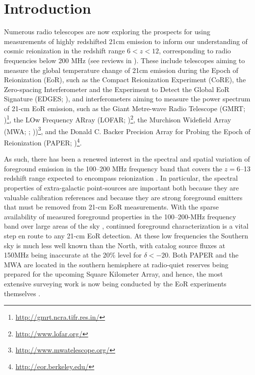 \documentclass[preprint]{aastex}
\begin{document}


\section{Introduction}

Numerous radio telescopes are now exploring the prospects for using
measurements of highly redshifted 21cm emission to inform our understanding of
cosmic reionization in the redshift range $6< z<12$, corresponding to radio
frequencies below 200 MHz (see reviews in
\citealt{Furlanetto:2006p2267,Morales:2010p8093,Pritchard:2012p9555}).  These
include telescopes aiming to measure the global temperature change of 21cm
emission during the Epoch of Reionization (EoR), such as the Compact
Reionization Experiment (CoRE), the Zero-spacing Interferometer \citep{Raghunathan:2011}  and the Experiment to Detect the Global EoR
Signature (EDGES; \citealt{Bowman:2010p8546}), and interferometers aiming to
measure the power spectrum of 21-cm EoR emission, such as the Giant Metre-wave
Radio Telescope (GMRT;
\citealt{Paciga:2011p9470,Paciga:2013p9627})\footnote{\url{http://gmrt.ncra.tifr.res.in/}},
the LOw Frequency ARray (LOFAR;
\citealt{Yatawatta:2013p9699})\footnote{\url{http://www.lofar.org/}}, the
Murchison Widefield Array (MWA;  \citealt{Bowman:2012p9138};
\citealt{Tingay:2013p9022}))\footnote{\url{http://www.mwatelescope.org/}}, and
the Donald C. Backer Precision Array for Probing the Epoch of Reionization
(PAPER; \citealt{Parsons:2010p6757,Pober:2013p9567})\footnote{\url{http://eor.berkeley.edu/}}.

As such, there has been a renewed interest in the spectral and spatial variation of
foreground emission in the 100--200 MHz frequency band that covers
the $z=6$--13 redshift range expected to encompass reionization
\citep{Furlanetto:2006p2267}.
In particular, the spectral properties of extra-galactic point-sources are important
both because they are valuable calibration references
and because they are strong foreground emitters that must be removed from 21-cm EoR measurements.
With the sparse availability of measured foreground properties in the
100--200-MHz frequency band over large areas of the sky \citep{deOliveiraCosta:2008p2242}, continued
foreground characterization is a
vital step en route to any 21-cm EoR detection.
At these low
frequencies the Southern sky is much less well known than the North, 
with catalog source fluxes at 150MHz being inaccurate at the 20\% level
for $\delta<-20$\arcdeg \citep{Slee:1995p7541,Vollmer:2005p6425}.
Both PAPER and the MWA are located in the southern hemisphere at radio-quiet
reserves being prepared for the upcoming Square Kilometer Array, and hence,
the
most extensive surveying work is now being conducted by the EoR experiments
themselves \citep{Jacobs:2011p8438,Williams:2012p8768,Bernardi:2013p9859}.
\end{document}
